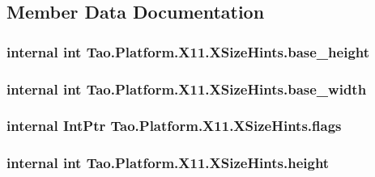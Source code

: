 \subsection{Member Data Documentation}
\hypertarget{struct_tao_1_1_platform_1_1_x11_1_1_x_size_hints_a5da90acf7805a37ee48bfde0198a9afe}{
\subsubsection[{base\_\-height}]{\setlength{\rightskip}{0pt plus 5cm}internal int {\bf Tao.Platform.X11.XSizeHints.base\_\-height}}}
\label{struct_tao_1_1_platform_1_1_x11_1_1_x_size_hints_a5da90acf7805a37ee48bfde0198a9afe}
\hypertarget{struct_tao_1_1_platform_1_1_x11_1_1_x_size_hints_a95ec859edb9b7c86987d0a38e2efd6e8}{
\subsubsection[{base\_\-width}]{\setlength{\rightskip}{0pt plus 5cm}internal int {\bf Tao.Platform.X11.XSizeHints.base\_\-width}}}
\label{struct_tao_1_1_platform_1_1_x11_1_1_x_size_hints_a95ec859edb9b7c86987d0a38e2efd6e8}
\hypertarget{struct_tao_1_1_platform_1_1_x11_1_1_x_size_hints_a39cb883268496bbfb86d06a52f928443}{
\subsubsection[{flags}]{\setlength{\rightskip}{0pt plus 5cm}internal IntPtr {\bf Tao.Platform.X11.XSizeHints.flags}}}
\label{struct_tao_1_1_platform_1_1_x11_1_1_x_size_hints_a39cb883268496bbfb86d06a52f928443}
\hypertarget{struct_tao_1_1_platform_1_1_x11_1_1_x_size_hints_a4d90b6c3ae85887cb0e4804124a4479f}{
\subsubsection[{height}]{\setlength{\rightskip}{0pt plus 5cm}internal int {\bf Tao.Platform.X11.XSizeHints.height}}}
